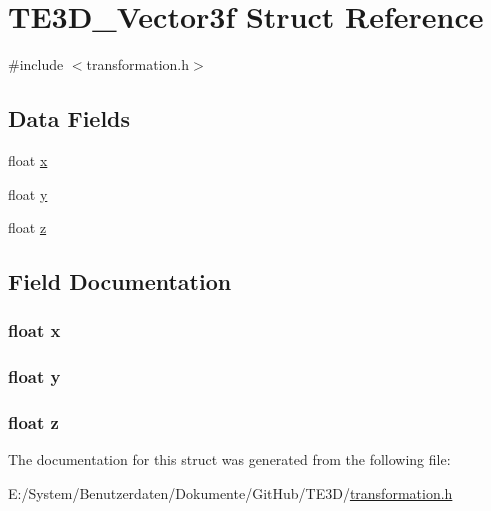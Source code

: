 \hypertarget{struct_t_e3_d___vector3f}{\section{T\-E3\-D\-\_\-\-Vector3f Struct Reference}
\label{struct_t_e3_d___vector3f}
}


{\ttfamily \#include $<$transformation.\-h$>$}

\subsection*{Data Fields}
\begin{DoxyCompactItemize}
\item 
float \hyperlink{struct_t_e3_d___vector3f_ad0da36b2558901e21e7a30f6c227a45e}{x}
\item 
float \hyperlink{struct_t_e3_d___vector3f_aa4f0d3eebc3c443f9be81bf48561a217}{y}
\item 
float \hyperlink{struct_t_e3_d___vector3f_af73583b1e980b0aa03f9884812e9fd4d}{z}
\end{DoxyCompactItemize}


\subsection{Field Documentation}
\hypertarget{struct_t_e3_d___vector3f_ad0da36b2558901e21e7a30f6c227a45e}{
\subsubsection[{x}]{\setlength{\rightskip}{0pt plus 5cm}float x}}\label{struct_t_e3_d___vector3f_ad0da36b2558901e21e7a30f6c227a45e}
\hypertarget{struct_t_e3_d___vector3f_aa4f0d3eebc3c443f9be81bf48561a217}{
\subsubsection[{y}]{\setlength{\rightskip}{0pt plus 5cm}float y}}\label{struct_t_e3_d___vector3f_aa4f0d3eebc3c443f9be81bf48561a217}
\hypertarget{struct_t_e3_d___vector3f_af73583b1e980b0aa03f9884812e9fd4d}{
\subsubsection[{z}]{\setlength{\rightskip}{0pt plus 5cm}float z}}\label{struct_t_e3_d___vector3f_af73583b1e980b0aa03f9884812e9fd4d}


The documentation for this struct was generated from the following file\-:\begin{DoxyCompactItemize}
\item 
E\-:/\-System/\-Benutzerdaten/\-Dokumente/\-Git\-Hub/\-T\-E3\-D/\hyperlink{transformation_8h}{transformation.\-h}\end{DoxyCompactItemize}
